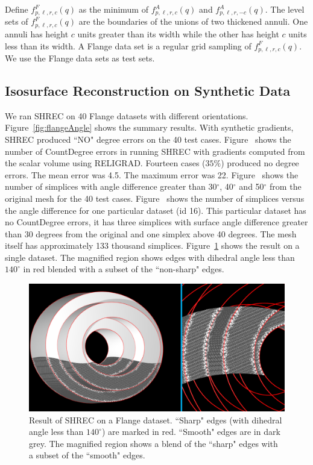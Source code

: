 Define $f^F_{p,\ell,r,c}(q)$ as the minimum
of $f^A_{p,\ell,r,c}(q)$ and $f^A_{p,\ell,r,-c}(q)$.
The level sets of $f^F_{p,\ell,r,c}(q)$ are the boundaries
of the unions of two thickened annuli.
One annuli has height $c$ units greater than its width
while the other has height $c$ units less than its width.
A Flange data set is a regular grid sampling of $f^F_{p,\ell,r,c}(q)$. 
We use the Flange data sets as test sets.

\subsection{Isosurface Reconstruction on Synthetic Data}
We ran SHREC on 40 Flange datasets with different orientations. Figure~\ref{fig:flangeAngle} shows the summary results.
With synthetic gradients, SHREC produced ``NO" degree errors on the 40 test cases.
Figure~\protect{} shows the number of CountDegree errors in running SHREC with gradients computed from the scalar volume using RELIGRAD.
Fourteen cases ($35\%$) produced no degree errors. The mean error was 4.5. The maximum error was 22.
Figure~\protect{} shows the number of simplices with angle difference greater than 30$^\circ$, 40$^\circ$ and 50$^\circ$ from the original mesh for the 40 test cases. Figure~\protect{} shows  the number of simplices versus the angle difference for one particular dataset (id 16). This particular dataset has no CountDegree errors, it has three simplices with surface angle difference greater than 30 degrees from the original and one simplex above 40 degrees. The mesh itself has approximately 133 thousand simplices. 
Figure~\ref{fig:flange1} shows the result on a single dataset. The magnified region shows edges with dihedral angle less than $140^\circ$ in red blended with a subset of the ``non-sharp" edges. 

\begin{figure}[t]
\includegraphics[width=\linewidth]{images/shrecFlangeCombine2.eps}
\caption{Result of SHREC on a Flange dataset. ``Sharp" edges (with dihedral angle less than $140^\circ$) are marked in red. 
``Smooth" edges are in dark grey. The magnified region shows a blend of the ``sharp" edges with a subset of the ``smooth" edges.}
\label{fig:flange1}
\end{figure}

